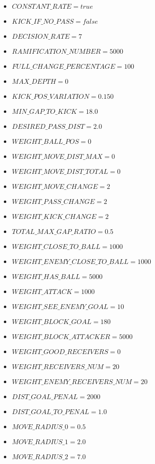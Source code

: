 \begin{itemize}
  \item $CONSTANT{\_}RATE = true$
  \item $KICK{\_}IF{\_}NO{\_}PASS = false$
  \item $DECISION{\_}RATE = 7$
  \item $RAMIFICATION{\_}NUMBER = 5000$
  \item $FULL{\_}CHANGE{\_}PERCENTAGE = 100$
  \item $MAX{\_}DEPTH = 0$
  \item $KICK{\_}POS{\_}VARIATION = 0.150$
  \item $MIN{\_}GAP{\_}TO{\_}KICK = 18.0$
  \item $DESIRED{\_}PASS{\_}DIST = 2.0$
  \item $WEIGHT{\_}BALL{\_}POS = 0$
  \item $WEIGHT{\_}MOVE{\_}DIST{\_}MAX = 0$
  \item $WEIGHT{\_}MOVE{\_}DIST{\_}TOTAL = 0$
  \item $WEIGHT{\_}MOVE{\_}CHANGE = 2$
  \item $WEIGHT{\_}PASS{\_}CHANGE = 2$
  \item $WEIGHT{\_}KICK{\_}CHANGE = 2$
  \item $TOTAL{\_}MAX{\_}GAP{\_}RATIO = 0.5$
  \item $WEIGHT{\_}CLOSE{\_}TO{\_}BALL = 1000$
  \item $WEIGHT{\_}ENEMY{\_}CLOSE{\_}TO{\_}BALL = 1000$
  \item $WEIGHT{\_}HAS{\_}BALL = 5000$
  \item $WEIGHT{\_}ATTACK = 1000$
  \item $WEIGHT{\_}SEE{\_}ENEMY{\_}GOAL = 10$
  \item $WEIGHT{\_}BLOCK{\_}GOAL = 180$
  \item $WEIGHT{\_}BLOCK{\_}ATTACKER = 5000$
  \item $WEIGHT{\_}GOOD{\_}RECEIVERS = 0$
  \item $WEIGHT{\_}RECEIVERS{\_}NUM = 20$
  \item $WEIGHT{\_}ENEMY{\_}RECEIVERS{\_}NUM = 20$
  \item $DIST{\_}GOAL{\_}PENAL = 2000$
  \item $DIST{\_}GOAL{\_}TO{\_}PENAL = 1.0$
  \item $MOVE{\_}RADIUS{\_}0 = 0.5$
  \item $MOVE{\_}RADIUS{\_}1 = 2.0$
  \item $MOVE{\_}RADIUS{\_}2 = 7.0$
\end{itemize}

